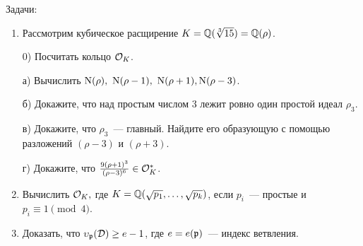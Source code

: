  	

 		\begin{homework}
 			Задачи:
 			\begin{enumerate}
 				\item Рассмотрим кубическое расщирение $K = \mathbb{Q}(\sqrt[3]{15}) = \mathbb{Q}(\rho)$. 

 				0) Посчитать кольцо $\mathcal{O}_{K}$.

 				а) Вычислить $\Nm(\rho), \ \Nm(\rho - 1), \ \Nm(\rho + 1), \Nm(\rho - 3)$.

 				б) Докажите, что над простым числом 3 лежит ровно один простой идеал $\rho_3$.

 				в) Докажите, что $\rho_3$~--- главный. Найдите его образующую с помощью разложений $(\rho - 3)$ и $(\rho + 3)$.

 				г) Докажите, что $\frac{9(\rho + 1)^3}{(\rho  - 3)^6}  \in \mathcal{O}_{K}^{*}$. 

 				\item Вычислить $\mathcal{O}_{K},$ где $K = \mathbb{Q}(\sqrt{p_1}, \ldots, \sqrt{p_k})$, если $p_i$~--- простые и $p_i \equiv 1 \pmod{4}$.
 				\item  Доказать, что $\upsilon_{\mathfrak{p}}(\mathcal{D}) \ge e - 1$, где $ e = e(\mathfrak{p})$~--- индекс ветвления. 

 			\end{enumerate}
 		\end{homework}

 		
 	
